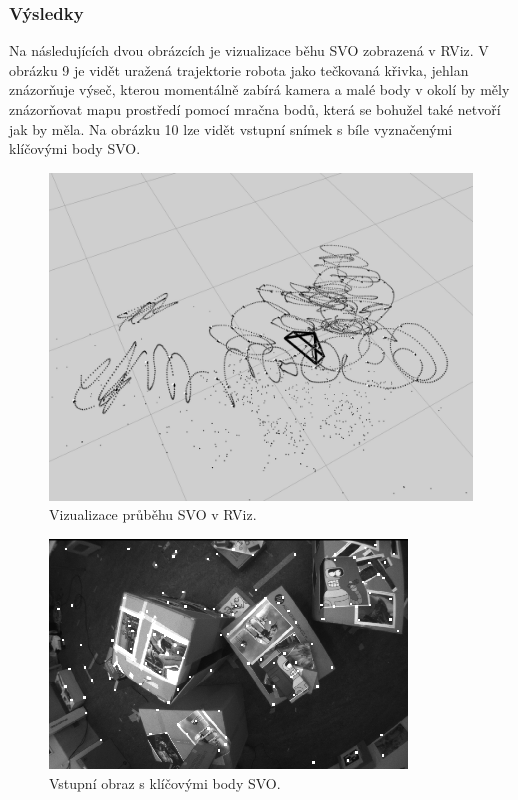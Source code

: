 \documentclass[12pt,a4paper]{article}
\begin{document}
\subsubsection*{Výsledky} 
Na následujících dvou obrázcích je vizualizace běhu SVO zobrazená v RViz. V obrázku 9 je vidět uražená trajektorie robota jako tečkovaná křivka, jehlan znázorňuje výseč, kterou momentálně zabírá kamera a malé body v okolí by měly znázorňovat mapu prostředí pomocí mračna bodů, která se bohužel také netvoří jak by měla. Na obrázku 10 lze vidět vstupní snímek s bíle vyznačenými klíčovými body SVO.
 
\begin{figure}[H]
\centering
\includegraphics[scale=0.5]{img/SVO_rviz_1.png}
\caption{Vizualizace průběhu SVO v RViz.}
\end{figure}

\begin{figure}[H]
\centering
\includegraphics[scale=1]{img/SVO_rviz_2.png}
\caption{Vstupní obraz s klíčovými body SVO.}
\end{figure}
\end{document}
